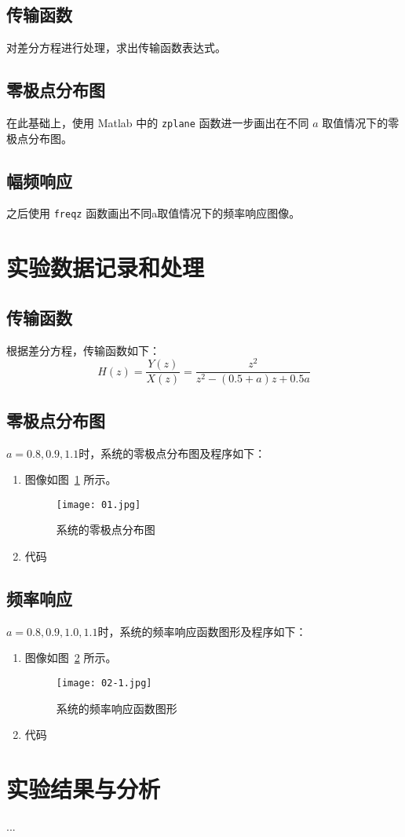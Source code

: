 \documentclass{zjureport}
\begin{document}
  \subsection{传输函数}
      对差分方程进行处理，求出传输函数表达式。
  \subsection{零极点分布图}
      在此基础上，使用 Matlab 中的 \texttt{zplane} 函数进一步画出在不同 $a$ 取值情况下的零极点分布图。
  \subsection{幅频响应}
      之后使用 \texttt{freqz} 函数画出不同a取值情况下的频率响应图像。


\section{实验数据记录和处理}
  \subsection{传输函数}
      根据差分方程，传输函数如下：
      $$H(z) = \frac{Y(z)}{X(z)} = \frac{z^2}{z^2-(0.5+a)z+0.5a}$$
  \subsection{零极点分布图}
      $a = 0.8, 0.9, 1.1$时，系统的零极点分布图及程序如下：
      \begin{enumerate}
          \item 图像如图~\ref{fig:dist} 所示。
                \begin{figure}[!htbp]
                    \centering
                    \texttt{[image: 01.jpg]}
                    \caption{系统的零极点分布图}
                    \label{fig:dist}
                \end{figure}
          \item 代码
                
      \end{enumerate}

  \subsection{频率响应}
      $a = 0.8, 0.9, 1.0, 1.1$时，系统的频率响应函数图形及程序如下：
      \begin{enumerate}
          \item 图像如图~\ref{fig:resp} 所示。
                \begin{figure}[!htbp]
                    \centering
                    \texttt{[image: 02-1.jpg]}
                    \caption{系统的频率响应函数图形}
                    \label{fig:resp}
                \end{figure}
          \item 代码
                
      \end{enumerate}

      
\section{实验结果与分析}
...
\end{document}
